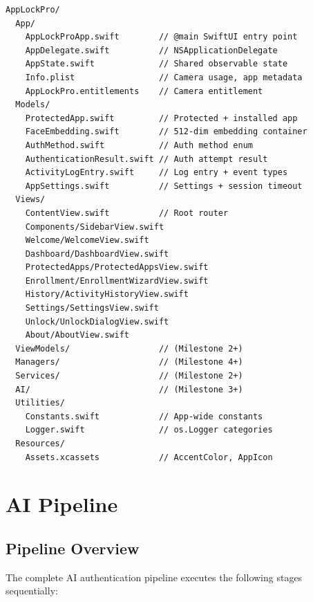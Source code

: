 \documentclass[12pt,a4paper]{report}
\begin{document}
\begin{lstlisting}[caption={Project directory structure}]
AppLockPro/
  App/
    AppLockProApp.swift        // @main SwiftUI entry point
    AppDelegate.swift          // NSApplicationDelegate
    AppState.swift             // Shared observable state
    Info.plist                 // Camera usage, app metadata
    AppLockPro.entitlements    // Camera entitlement
  Models/
    ProtectedApp.swift         // Protected + installed app
    FaceEmbedding.swift        // 512-dim embedding container
    AuthMethod.swift           // Auth method enum
    AuthenticationResult.swift // Auth attempt result
    ActivityLogEntry.swift     // Log entry + event types
    AppSettings.swift          // Settings + session timeout
  Views/
    ContentView.swift          // Root router
    Components/SidebarView.swift
    Welcome/WelcomeView.swift
    Dashboard/DashboardView.swift
    ProtectedApps/ProtectedAppsView.swift
    Enrollment/EnrollmentWizardView.swift
    History/ActivityHistoryView.swift
    Settings/SettingsView.swift
    Unlock/UnlockDialogView.swift
    About/AboutView.swift
  ViewModels/                  // (Milestone 2+)
  Managers/                    // (Milestone 4+)
  Services/                    // (Milestone 2+)
  AI/                          // (Milestone 3+)
  Utilities/
    Constants.swift            // App-wide constants
    Logger.swift               // os.Logger categories
  Resources/
    Assets.xcassets            // AccentColor, AppIcon
\end{lstlisting}

\chapter{AI Pipeline}

\section{Pipeline Overview}
The complete AI authentication pipeline executes the following stages sequentially:
\end{document}
